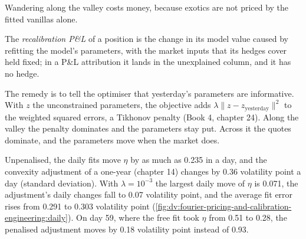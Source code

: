 Wandering along the valley costs money, because exotics are not priced by the fitted vanillas alone.

\begin{definition}[Recalibration P\&L]\label{def:dv:fourier-pricing-and-calibration-engineering:recalib}
The \emph{recalibration P\&L} of a position is the change in its model value caused by refitting the model's
parameters, with the market inputs that its hedges cover held fixed; in a P\&L attribution it lands in the unexplained column, and it has no
hedge.
\end{definition}

The remedy is to tell the optimiser that yesterday's parameters are informative. With $z$ the unconstrained parameters, the objective adds
$\lambda\lVert z-z_{\text{yesterday}}\rVert^2$ to the weighted squared errors, a Tikhonov penalty (Book 4, chapter 24). Along the valley the
penalty dominates and the parameters stay put. Across it the quotes dominate, and the parameters move when the market does.

\begin{example}\label{ex:dv:fourier-pricing-and-calibration-engineering:daily}
Unpenalised, the daily fits move $\eta$ by as much as 0.235 in a day, and the convexity adjustment of a one-year  (chapter 14)
changes by 0.36 volatility point a day (standard deviation). With $\lambda=10^{-3}$ the largest daily move of $\eta$ is 0.071, the
adjustment's daily changes fall to 0.07 volatility point, and the average fit error rises from 0.291 to 0.303 volatility point
(\cref{fig:dv:fourier-pricing-and-calibration-engineering:daily}). On day 59, where the free fit took $\eta$ from 0.51 to 0.28, the
penalised adjustment moves by 0.18 volatility point instead of 0.93.
\end{example}

